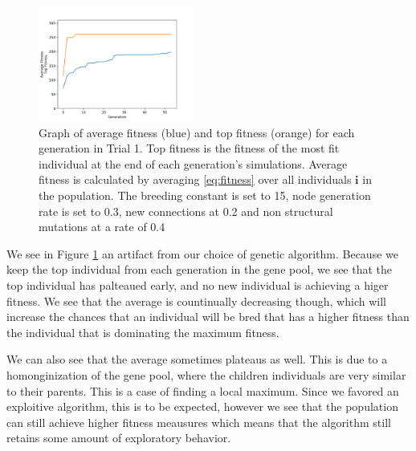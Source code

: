 \documentclass{article}
\begin{document}
\begin{multicols}{2}
\begin{figure}[H]\label{fig:fitness graph}
\centering
\includegraphics[width=0.45\textwidth]{fig_1}
\begin{changemargin}{0.15in}{0.15in}
  \caption{Graph of average fitness (blue) and top fitness (orange) for each
    generation in Trial 1. Top fitness is the fitness of the most fit individual
    at the end of each generation's simulations. Average fitness is calculated
    by averaging \eqref{eq:fitness} over all individuals $\bm{i}$ in the
    population. The breeding constant is set to 15, node generation rate is set
    to 0.3, new connections at 0.2 and non structural mutations at a rate of
    0.4}
\end{changemargin}
\end{figure}

We see in Figure \ref{fig:fitness graph} an artifact from our choice of genetic
algorithm. Because we keep the top individual from each generation in the gene
pool, we see that the top individual has palteaued early, and no new individual
is achieving a higer fitness. We see that the average is countinually decreasing
though, which will increase the chances that an individual will be bred that has
a higher fitness than the individual that is dominating the maximum fitness.

We can also see that the average sometimes plateaus as well. This is due to a
homonginization of the gene pool, where the children individuals are very
similar to their parents. This is a case of finding a local maximum. Since we
favored an exploitive algorithm, this is to be expected, however we see that the
population can still achieve higher fitness meausures which means that the
algorithm still retains some amount of exploratory behavior.


\end{multicols}
\end{document}
